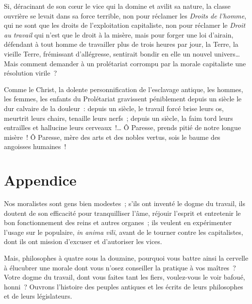 \documentclass[french,twoside]{book} %
\newcommand\chapteropen{} %
\newcommand\chaptercont{} %
\newcommand\chapterclose{} %
\begin{document}
\noindent Si, déracinant de son cœur le vice qui la domine et avilit sa nature, la classe ouvrière se levait dans sa force terrible, non pour réclamer les \emph{Droits de l’homme}, qui ne sont que les droits de l’exploitation capitaliste, non pour réclamer le \emph{Droit au travail} qui n’est que le droit à la misère, mais pour forger une loi d’airain, défendant à tout homme de travailler plus de trois heures par jour, la Terre, la vieille Terre, frémissant d’allégresse, sentirait bondir en elle un nouvel univers… Mais comment demander à un prolétariat corrompu par la morale capitaliste une résolution virile ?\par
Comme le Christ, la dolente personnification de l’esclavage antique, les hommes, les femmes, les enfants du Prolétariat gravissent péniblement depuis un siècle le dur calvaire de la douleur : depuis un siècle, le travail forcé brise leurs os, meurtrit leurs chairs, tenaille leurs nerfs ; depuis un siècle, la faim tord leurs entrailles et hallucine leurs cerveaux !… Ô Paresse, prends pitié de notre longue misère ! Ô Paresse, mère des arts et des nobles vertus, sois le baume des angoisses humaines !
\chapterclose


\chapteropen
\chapter[Appendice]{Appendice}\renewcommand{\leftmark}{Appendice}


\chaptercont
\noindent Nos moralistes sont gens bien modestes ; s’ils ont inventé le dogme du travail, ils doutent de son efficacité pour tranquilliser l’âme, réjouir l’esprit et entretenir le bon fonctionnement des reins et autres organes ; ils veulent en expérimenter l’usage sur le populaire, \emph{in anima vili}, avant de le tourner contre les capitalistes, dont ils ont mission d’excuser et d’autoriser les vices.\par
Mais, philosophes à quatre sous la douzaine, pourquoi vous battre ainsi la cervelle à élucubrer une morale dont vous n’osez conseiller la pratique à vos maîtres ? Votre dogme du travail, dont vous faites tant les fiers, voulez-vous le voir bafoué, honni ? Ouvrons l’histoire des peuples antiques et les écrits de leurs philosophes et de leurs législateurs.\par
\end{document}
